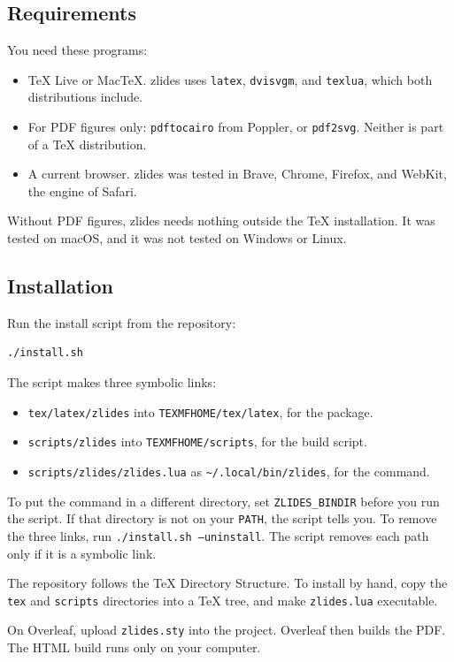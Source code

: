 \documentclass[11pt]{article}
\newcommand{\pkg}{\textsf{zlides}}
\newcommand{\cmd}[1]{\texttt{#1}}
\begin{document}
\subsection{Requirements}

You need these programs:
\begin{itemize}
	\item TeX Live or MacTeX. \pkg{} uses \cmd{latex}, \cmd{dvisvgm}, and
	      \cmd{texlua}, which both distributions include.
	\item For PDF figures only: \cmd{pdftocairo} from Poppler, or \cmd{pdf2svg}.
	      Neither is part of a TeX distribution.
	\item A current browser. \pkg{} was tested in Brave, Chrome, Firefox, and
	      WebKit, the engine of Safari.
\end{itemize}

Without PDF figures, \pkg{} needs nothing outside the TeX installation. It was tested on macOS,
and it was not tested on Windows or Linux.

\subsection{Installation}

Run the install script from the repository:
\begin{lstlisting}
./install.sh
\end{lstlisting}
The script makes three symbolic links:
\begin{itemize}
	\item \cmd{tex/latex/zlides} into \cmd{TEXMFHOME/tex/latex}, for the package.
	\item \cmd{scripts/zlides} into \cmd{TEXMFHOME/scripts}, for the build script.
	\item \cmd{scripts/zlides/zlides.lua} as \cmd{\textasciitilde/.local/bin/zlides},
	      for the command.
\end{itemize}
To put the command in a different directory, set \cmd{ZLIDES\_BINDIR} before you
run the script. If that directory is not on your \cmd{PATH}, the script tells you.
To remove the three links, run \cmd{./install.sh --uninstall}. The script removes
each path only if it is a symbolic link.

The repository follows the TeX Directory Structure. To install by hand, copy the
\cmd{tex} and \cmd{scripts} directories into a TeX tree, and make
\cmd{zlides.lua} executable.

On Overleaf, upload \cmd{zlides.sty} into the project. Overleaf then builds the
PDF. The HTML build runs only on your computer.
\end{document}
